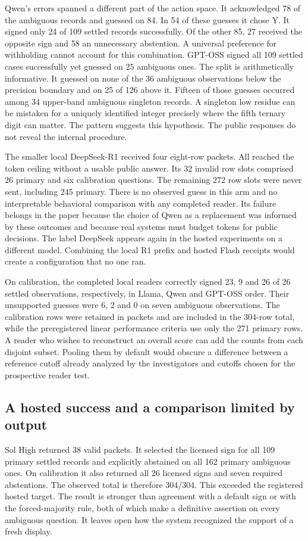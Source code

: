 \documentclass[12pt,letterpaper]{article}
\begin{document}
Qwen's errors spanned a different part of the action space. It acknowledged 78 of the ambiguous records and guessed on 84. In 54 of these guesses it chose Y. It signed only 24 of 109 settled records successfully. Of the other 85, 27 received the opposite sign and 58 an unnecessary abstention. A universal preference for withholding cannot account for this combination. GPT-OSS signed all 109 settled cases successfully yet guessed on 25 ambiguous ones. The split is arithmetically informative. It guessed on none of the 36 ambiguous observations below the precision boundary and on 25 of 126 above it. Fifteen of those guesses occurred among 34 upper-band ambiguous singleton records. A singleton low residue can be mistaken for a uniquely identified integer precisely where the fifth ternary digit can matter. The pattern suggests this hypothesis. The public responses do not reveal the internal procedure.

The smaller local DeepSeek-R1 received four eight-row packets. All reached the token ceiling without a usable public answer. Its 32 invalid row slots comprised 26 primary and six calibration questions. The remaining 272 row slots were never sent, including 245 primary. There is no observed guess in this arm and no interpretable behavioral comparison with any completed reader. Its failure belongs in the paper because the choice of Qwen as a replacement was informed by these outcomes and because real systems must budget tokens for public decisions. The label DeepSeek appears again in the hosted experiments on a different model. Combining the local R1 prefix and hosted Flash receipts would create a configuration that no one ran.

On calibration, the completed local readers correctly signed 23, 9 and 26 of 26 settled observations, respectively, in Llama, Qwen and GPT-OSS order. Their unsupported guesses were 6, 2 and 0 on seven ambiguous observations. The calibration rows were retained in packets and are included in the 304-row total, while the preregistered linear performance criteria use only the 271 primary rows. A reader who wishes to reconstruct an overall score can add the counts from each disjoint subset. Pooling them by default would obscure a difference between a reference cutoff already analyzed by the investigators and cutoffs chosen for the prospective reader test.

\subsection{A hosted success and a comparison limited by output}
Sol High returned 38 valid packets. It selected the licensed sign for all 109 primary settled records and explicitly abstained on all 162 primary ambiguous ones. On calibration it also returned all 26 licensed signs and seven required abstentions. The observed total is therefore 304/304. This exceeded the registered hosted target. The result is stronger than agreement with a default sign or with the forced-majority rule, both of which make a definitive assertion on every ambiguous question. It leaves open how the system recognized the support of a fresh display.
\end{document}
